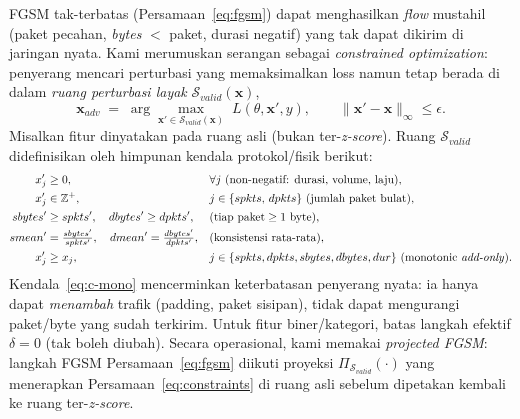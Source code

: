 \documentclass[11pt,a4paper]{article}
\begin{document}
FGSM tak-terbatas (Persamaan~\eqref{eq:fgsm}) dapat menghasilkan \emph{flow}
mustahil (paket pecahan, \emph{bytes} $<$ paket, durasi negatif) yang tak dapat
dikirim di jaringan nyata. Kami merumuskan serangan sebagai \emph{constrained
optimization}: penyerang mencari perturbasi yang memaksimalkan loss namun tetap
berada di dalam \emph{ruang perturbasi layak} $\mathcal{S}_{valid}(\mathbf{x})$,
\begin{equation}
\label{eq:fpe-opt}
\mathbf{x}_{adv} \;=\; \arg\max_{\mathbf{x}' \in \mathcal{S}_{valid}(\mathbf{x})}\;
L\!\left(\theta,\mathbf{x}',y\right),
\qquad
\|\mathbf{x}' - \mathbf{x}\|_\infty \le \epsilon .
\end{equation}
Misalkan fitur dinyatakan pada ruang asli (bukan ter-\emph{z-score}). Ruang
$\mathcal{S}_{valid}$ didefinisikan oleh himpunan kendala protokol/fisik berikut:
\begin{subequations}
\label{eq:constraints}
\begin{align}
x'_j &\ge 0, && \forall j \ \text{(non-negatif: durasi, volume, laju)}, \label{eq:c-nonneg}\\
x'_j &\in \mathbb{Z}^{+}, && j \in \{spkts,\, dpkts\} \ \text{(jumlah paket bulat)}, \label{eq:c-int}\\
sbytes' &\ge spkts', \quad dbytes' \ge dpkts', && \text{(tiap paket} \ge 1 \ \text{byte)}, \label{eq:c-consistency}\\
smean' &= \tfrac{sbytes'}{spkts'}, \quad dmean' = \tfrac{dbytes'}{dpkts'}, && \text{(konsistensi rata-rata)}, \label{eq:c-mean}\\
x'_j &\ge x_j, && j \in \{spkts, dpkts, sbytes, dbytes, dur\} \ \text{(monotonic \emph{add-only})}. \label{eq:c-mono}
\end{align}
\end{subequations}
Kendala~\eqref{eq:c-mono} mencerminkan keterbatasan penyerang nyata: ia hanya
dapat \emph{menambah} trafik (padding, paket sisipan), tidak dapat mengurangi
paket/byte yang sudah terkirim. Untuk fitur biner/kategori, batas langkah
efektif $\delta = 0$ (tak boleh diubah). Secara operasional, kami memakai
\emph{projected FGSM}: langkah FGSM Persamaan~\eqref{eq:fgsm} diikuti proyeksi
$\Pi_{\mathcal{S}_{valid}}(\cdot)$ yang menerapkan Persamaan~\eqref{eq:constraints}
di ruang asli sebelum dipetakan kembali ke ruang ter-\emph{z-score}.
\end{document}
